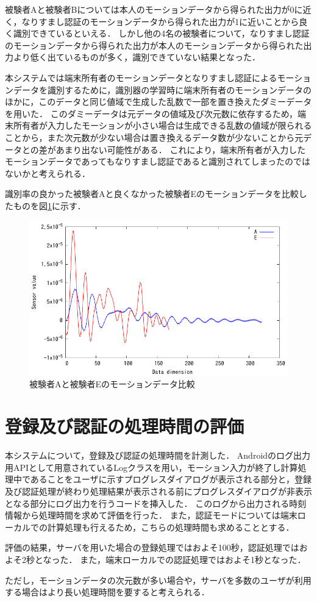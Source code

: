 被験者Aと被験者Bについては本人のモーションデータから得られた出力が0に近く，なりすまし認証のモーションデータから得られた出力が1に近いことから良く識別できているといえる．
しかし他の4名の被験者について，なりすまし認証のモーションデータから得られた出力が本人のモーションデータから得られた出力より低く出ているものが多く，識別できていない結果となった．

本システムでは端末所有者のモーションデータとなりすまし認証によるモーションデータを識別するために，識別器の学習時に端末所有者のモーションデータのほかに，このデータと同じ値域で生成した乱数で一部を置き換えたダミーデータを用いた．
このダミーデータは元データの値域及び次元数に依存するため，端末所有者が入力したモーションが小さい場合は生成できる乱数の値域が限られることから，また次元数が少ない場合は置き換えるデータ数が少ないことから元データとの差があまり出ない可能性がある．
これにより，端末所有者が入力したモーションデータであってもなりすまし認証であると識別されてしまったのではないかと考えられる．

識別率の良かった被験者Aと良くなかった被験者Eのモーションデータを比較したものを図\ref{compare}に示す．

\begin{figure}[hbtp]
  \centering
  \includegraphics[bb=0 0 360 216, width=12cm]{Graphs/comp.pdf}
  \caption{被験者Aと被験者Eのモーションデータ比較}
  \label{compare}
\end{figure}

\section{登録及び認証の処理時間の評価}
本システムについて，登録及び認証の処理時間を計測した．
Androidのログ出力用APIとして用意されているLogクラス\cite{5-log}を用い，モーション入力が終了し計算処理中であることをユーザに示すプログレスダイアログが表示される部分と，登録及び認証処理が終わり処理結果が表示される前にプログレスダイアログが非表示となる部分にログ出力を行うコードを挿入した．
このログから出力される時刻情報から処理時間を求めて評価を行った．
また，認証モードについては端末ローカルでの計算処理も行えるため，こちらの処理時間も求めることとする．

評価の結果，サーバを用いた場合の登録処理ではおよそ100秒，認証処理ではおよそ2秒となった．
また，端末ローカルでの認証処理ではおよそ1秒となった．

ただし，モーションデータの次元数が多い場合や，サーバを多数のユーザが利用する場合はより長い処理時間を要すると考えられる．
